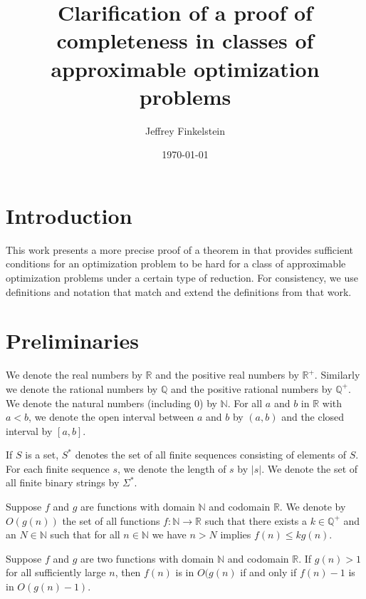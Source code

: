 \documentclass{article}
\author{Jef{}frey Finkelstein}
\date{\today}
\title{Clarification of a proof of completeness in classes of approximable optimization problems}
\begin{document}
\maketitle

\section{Introduction}
This work presents a more precise proof of a theorem in \cite{ep06} that provides sufficient conditions for an optimization problem to be hard for a class of approximable optimization problems under a certain type of reduction.
For consistency, we use definitions and notation that match and extend the definitions from that work.

\section{Preliminaries}
We denote the real numbers by $\mathbb{R}$ and the positive real numbers by $\mathbb{R}^+$.
Similarly we denote the rational numbers by $\mathbb{Q}$ and the positive rational numbers by $\mathbb{Q}^+$.
We denote the natural numbers (including 0) by $\mathbb{N}$.
For all $a$ and $b$ in $\mathbb{R}$ with $a < b$, we denote the open interval between $a$ and $b$ by $(a, b)$ and the closed interval by $[a, b]$.

If $S$ is a set, $S^*$ denotes the set of all finite sequences consisting of elements of $S$.
For each finite sequence $s$, we denote the length of $s$ by $|s|$.
We denote the set of all finite binary strings by $\Sigma^*$.

\begin{definition}\label{def:bigo}
  Suppose $f$ and $g$ are functions with domain $\mathbb{N}$ and codomain $\mathbb{R}$.
  We denote by $O(g(n))$ the set of all functions $f \colon \mathbb{N} \to \mathbb{R}$ such that there exists a $k \in \mathbb{Q}^+$ and an $N \in \mathbb{N}$ such that for all $n \in \mathbb{N}$ we have $n > N$ implies $f(n) \leq k g(n)$.
\end{definition}

\begin{lemma}\label{lem:bigo}
  Suppose $f$ and $g$ are two functions with domain $\mathbb{N}$ and codomain $\mathbb{R}$.
  If $g(n) > 1$ for all sufficiently large $n$, then $f(n)$ is in $O(g(n)$ if and only if $f(n) - 1$ is in $O(g(n) - 1)$.
\end{lemma}
\end{document}
